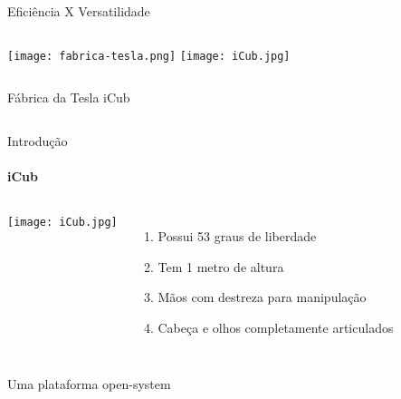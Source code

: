
\begin{frame}[t]{Eficiência X Versatilidade}
    \transboxout[duration=0.5]
    
    \begin{columns}
        \newline  
            \texttt{[image: fabrica-tesla.png]}
        \newline  
         \texttt{[image: iCub.jpg]}
    \end{columns}
    
    \begin{columns}
        \newline  
        Fábrica da Tesla
        \newline
        iCub
    \end{columns}
\end{frame}
\begin{frame}[t]{Introdução}
    \transboxout[duration=0.5]
    \framesubtitle{iCub}
    \begin{columns}
            \texttt{[image: iCub.jpg]}
            \begin{enumerate}
                \item Possui 53 graus de liberdade
                \item Tem 1 metro de altura
                \item Mãos com destreza para manipulação
                \item Cabeça e olhos completamente articulados
            \end{enumerate}
    \end{columns}
\end{frame}
\begin{frame}[c]{Uma plataforma open-system}
    \begin{figure}
    \end{figure}
\end{frame}
